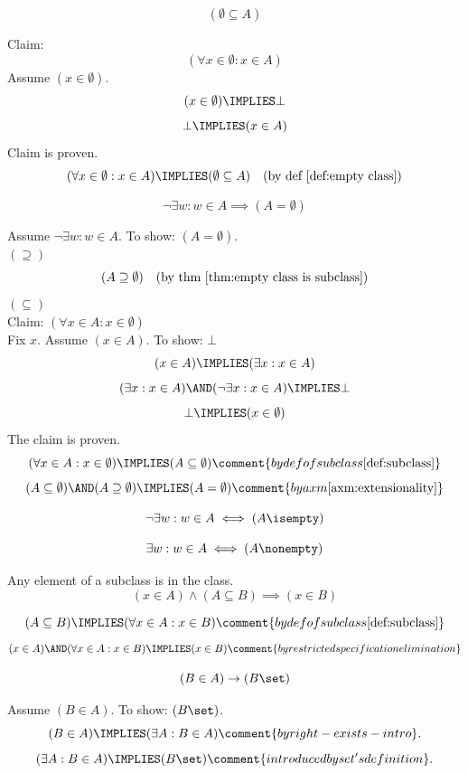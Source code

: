 \begin{theorem}
\label{thm:empty class is subclass}
\[
(\emptyset\subseteq A)
\]
\end{theorem}
\Proof
Claim:
\[
(\forall x\in \emptyset: x\in A)
\]
Assume $(x\in\emptyset)$.
\[
(x\in\emptyset)
\IMPLIES
\bot
\]
\[
\bot
\IMPLIES
(x\in A)
\]
Claim is proven.
\[
(\forall x\in \emptyset: x\in A)
\IMPLIES
(\emptyset\subseteq A)
\quad\mbox{(by def \ref{def:empty class})}
\]
\Done

\begin{theorem}
\[
\neg\exists w: w\in A
\implies
(A=\emptyset)
\]
\end{theorem}
\Proof
Assume $\neg\exists w: w\in A$. To show: $(A=\emptyset)$.\\
$(\supseteq)$\\
\[
(A\supseteq\emptyset)
\quad\mbox{(by thm \ref{thm:empty class is subclass})}
\]
$(\subseteq)$\\
Claim: $(\forall x\in A:x\in\emptyset)$\\
Fix $x$. Assume $(x\in A)$. To show: $\bot$\\
\[
(x\in A)
\IMPLIES
(\exists x:x\in A)
\]
\[
(\exists x:x\in A)
\AND
(\neg\exists x:x\in A)
\IMPLIES
\bot
\]
\[
\bot
\IMPLIES
(x\in\emptyset)
\]
The claim is proven.
\[
(\forall x\in A:x\in\emptyset)
\IMPLIES
(A \subseteq \emptyset)
\comment{by def of subclass \ref{def:subclass}}
\]
\[
(A \subseteq \emptyset)
\AND
(A \supseteq \emptyset)
\IMPLIES
(A=\emptyset)
\comment{by axm \ref{axm:extensionality}}
\]
\Done
\begin{theorem}
\[
\neg\exists w: w\in A
\iff
(A\isempty)
\]
\end{theorem}
\begin{theorem}
\[
\exists w: w\in A
\iff
(A\nonempty)
\]
\end{theorem}


\begin{theorem}
Any element of a subclass is in the class.
\label{thm:element of subclass}
\[
(x\in A)\land(A\subseteq B)\implies(x\in B)
\]
\end{theorem}
\Proof
\[
(A\subseteq B)
\IMPLIES
(\forall x\in A:x\in B)
\comment{by def of subclass \ref{def:subclass}}
\]
\[
(x\in A)
\AND
(\forall x\in A:x\in B)
\IMPLIES
(x\in B)
\comment{by restricted specification elimination}
\]
\Done


\begin{theorem}
\label{thm:in class then set}
\[
(B\in A) \rightarrow (B\set)
\]
\end{theorem}
\Proof
Assume $(B\in A)$. To show: $(B\set)$.
\[
(B\in A)
\IMPLIES
(\exists A: B\in A)
\comment{by right-exists-intro}.
\]
\[
(\exists A: B\in A)
\IMPLIES
(B\set)
\comment{introduced by set's definition}.
\]
\Done

